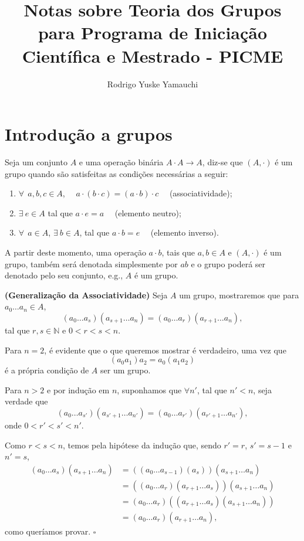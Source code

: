 \documentclass[11pt,openany]{book}
\title{Notas sobre Teoria dos Grupos para Programa de Iniciação Científica e Mestrado - PICME}
\author{Rodrigo Yuske Yamauchi}
\newcommand{\separate}{\vspace{1.5em}}
\begin{document}
\maketitle

\tableofcontents

\chapter{Introdução a grupos}

\begin{definition}
\label{def:grupo}
    Seja um conjunto $A$ e uma operação binária $A \cdot A \rightarrow A$, diz-se que $(A, \cdot)$ é um grupo quando são satisfeitas as condições necessárias a seguir:
    
    \begin{enumerate}[label=\Roman*)] %
        \item $\forall \ \ a,b,c \in A$, \ \ $a\cdot(b\cdot c) = (a\cdot b)\cdot c$ \ \ (associatividade);
        \item $\exists \ e \in A$ tal que $a\cdot e = a$ \ \ (elemento neutro);
        \item $\forall \ \ a \in A$, $\exists \ b \in A$, tal que $a\cdot b = e$ \ \ (elemento inverso).
    \end{enumerate}
\end{definition}

A partir deste momento, uma operação $a \cdot b$, tais que $a, b \in A$ e $(A,\cdot)$ é um grupo, também será denotada simplesmente por $ab$ e o grupo poderá ser denotado pelo seu conjunto, e.g., $A$ é um grupo.

    \separate

    \textbf{(Generalização da Associatividade)}
    Seja $A$ um grupo, mostraremos que para $a_0 \dots a_n \in A$, 
    \[(a_0 \dots a_s) (a_{s+1} \dots a_n) = (a_0 \dots a_r) (a_{r+1} \dots a_n),\]
    tal que $r,s \in \mathbb{N}$ e $0 < r < s < n$.

    Para $n = 2$, é evidente que o que queremos mostrar é verdadeiro, uma vez que \[(a_0a_1)a_2 = a_0(a_1a_2)\] é a própria condição de $A$ ser um grupo.

    Para $n > 2$ e por indução em $n$, suponhamos que $\forall n'$, tal que $n' < n$, seja verdade que 
    \[(a_0 \dots a_{s'}) (a_{s'+1} \dots a_{n'}) = (a_0 \dots a_{r'}) (a_{r'+1} \dots a_{n'}),\]
    onde $0 < r' < s' < n'$.

    Como $r < s < n$, temos pela hipótese da indução que, sendo $r' = r$, $s' = s-1$ e $n' = s$,
    \begin{align*}
        (a_0 \dots a_s) (a_{s+1} \dots a_n) &= \left((a_0 \dots a_{s-1})(a_s)\right) (a_{s+1} \dots a_n) \\
        &= \left((a_0 \dots a_r)(a_{r+1} \dots a_s)\right)(a_{s+1} \dots a_n)\\
        &= (a_0 \dots a_r)\left((a_{r+1} \dots a_s)(a_{s+1} \dots a_n)\right)\\
        &= (a_0 \dots a_r)(a_{r+1} \dots a_n),
    \end{align*}
    como queríamos provar. $\square$
\end{document}
